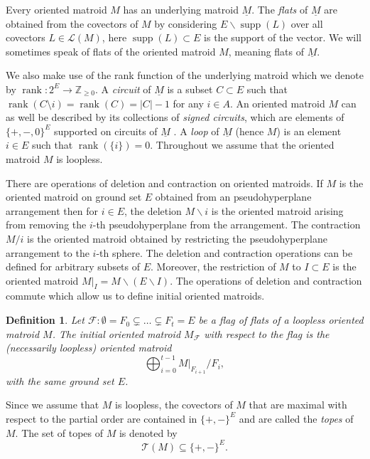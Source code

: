 \documentclass{amsart}
\newtheorem{definition}[theorem]{Definition}
\newcommand\Fcal{{\mathcal F}}
\DeclareMathOperator{\rank}{rank}
\DeclareMathOperator{\supp}{supp}
\begin{document}
{Every oriented matroid $M$ has an underlying matroid $\underline{M}$. The \emph{flats}  of $\underline{M}$  are obtained from the covectors of $M$ by considering $E \backslash \supp(L)$ over all covectors $L \in \mathcal{L}(M)$, here $\supp(L)\subset E$ is the support of the vector. We will sometimes speak of flats of the oriented matroid $M$, meaning flats of $\underline{M}$.

We also make use of the rank function of the underlying matroid which we denote by $\rank \colon 2^E \to \mathbb{Z}_{\geq 0}$.
A \emph{circuit} of $\underline{M}$ is a subset $C\subset E$ such that $\rank(C\setminus i)=\rank(C)=|C|-1$ for any $i\in A$. An oriented matroid $M$ can as well be described by its collections of {\em signed circuits}, which are elements of $\{+,-,0\}^E$ supported on circuits of $\underline{M}$ \cite[Section~3.2]{BLSWZ}. A \emph{loop} of $\underline{M}$ (hence $M$) is an element $i\in E$ such that $\rank(\{i\}) = 0$.
Throughout we assume that the oriented matroid $M$ is loopless. 

There are operations of deletion and contraction on oriented matroids.
If $M$ is the oriented matroid on ground set $E$ obtained from an pseudohyperplane arrangement then for $i \in E$, the deletion  $M \backslash i$ is the oriented matroid arising from removing the $i$-th pseudohyperplane from the arrangement. The contraction $M / i$ is the oriented matroid obtained by restricting the pseudohyperplane arrangement to the $i$-th sphere. The deletion and contraction operations can be defined for arbitrary subsets of $E$. Moreover, the restriction of $M$ to $I \subset E$ is the oriented matroid $M|_I = M \backslash (E \backslash I)$. The operations of deletion and contraction commute which allow us to define initial oriented matroids. 

\begin{definition}
Let $\Fcal:\emptyset=F_0 \subsetneq \ldots \subsetneq  F_t=E$ be a flag of flats of a loopless oriented matroid $M$.
The {\em initial oriented matroid} $M_{\Fcal}$ with respect to the flag is the (necessarily loopless) oriented matroid 
\begin{equation} \label{def:IM}
    \bigoplus_{i=0}^{t-1} M|_{F_{i+1}}/F_i,
\end{equation}
with the same ground set $E$.
\end{definition}

Since we assume that $M$ is loopless, the covectors of $M$ that are maximal with respect to the partial order are contained in $\{+, -\}^E$ and are called the \emph{topes} of $M$. The set of topes of $M$ is denoted by \[\mathcal{T}(M) \subseteq \{+, -\}^E.\] 

}
\end{document}
